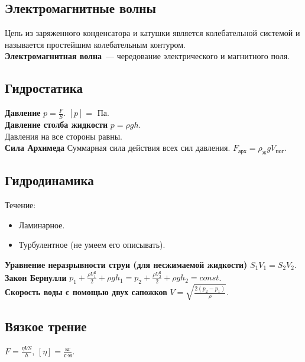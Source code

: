 \documentclass[12pt]{article}
\begin{document}
	\subsection{Электромагнитные волны}
	Цепь из заряженного конденсатора и катушки является колебательной системой и называется простейшим колебательным контуром.\\
	\textbf{Электромагнитная волна}~--- чередование электрического и магнитного поля.
	\subsection{Гидростатика}
	\textbf{Давление} $p = \frac{F}{S}$. $\left[p\right] =$ Па.\\
	\textbf{Давление столба жидкости} $p = \rho g h$.\\
	Давления на все стороны равны.\\
	\textbf{Сила Архимеда} Суммарная сила действия всех сил давления. $F_{\text{арх}} = \rho_{\text{ж}} g V_{\text{пог}}$.
	\subsection{Гидродинамика}
	Течение:
	\begin{itemize}
		\item Ламинарное.
		\item Турбулентное (не умеем его описывать).
	\end{itemize}
	\textbf{Уравнение неразрывности струи (для несжимаемой жидкости)} $S_1V_1 = S_2V_2$.\\
	\textbf{Закон Бернулли} $p_1 + \frac{\rho V_1^2}{2} + \rho g h_1 = p_2 + \frac{\rho V_2^2}{2} + \rho g h_2 = const$.\\
	\textbf{Скорость воды с помощью двух сапожков} $V = \sqrt{\frac{2(p_2 - p_1)}{\rho}}$.
	\subsection{Вязкое трение}
	$F = \frac{\eta V S}{h}$, $[\eta] = \frac{\text{кг}}{\text{с} \cdot \text{м}}$.
	
	
	
	
	
\end{document}

